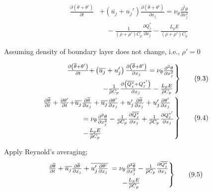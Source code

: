 \documentclass[fleqn,10pt]{SelfArx} %
\begin{document}
\begin{align*}
	\frac{\partial \left(\overline{\theta}+\theta'\right)}{\partial t} &+ \left(\overline{u_j} + u_j'\right)\frac{\partial \left(\overline{\theta} + \theta'\right)}{\partial x_j} = \nu_{\theta}\frac{\partial^2 \theta}{\partial x^2_j} \\ &\quad - \frac{1}{\left(\overline{\rho} + \rho'\right) C_p}\frac{\partial Q_j^*}{\partial x_j} - \frac{L_p E}{\left(\overline{\rho} + \rho'\right) C_p}
\end{align*}

Assuming density of boundary layer does not change, i.e., $\rho' = 0$

\begin{align*}
	\begin{rcases}
		\frac{\partial \left(\overline{\theta}+\theta'\right)}{\partial t} & \!\!\!\!\!\! + \left(\overline{u_j} + u_j'\right)\frac{\partial \left(\overline{\theta} + \theta'\right)}{\partial x_j} = \nu_{\theta}\frac{\partial^2 \theta}{\partial x^2_j} \\ &\quad - \frac{1}{\overline{\rho} C_p}\frac{\partial \left(\overline{Q_j^*} + Q_j^{*'}\right)}{\partial x_j} - \frac{L_p E}{\overline{\rho} C_p}
	\end{rcases} & \tag{9.3} \label{eq:9.3} \\
	\begin{rcases}
		\frac{\partial \overline{\theta}}{\partial t} + \frac{\partial \theta'}{\partial t} & \!\!\!\!\!\! + \overline{u_j} \frac{\partial \overline{\theta}}{\partial x_j} + \overline{u_j} \frac{\partial \theta'}{\partial x_j} + u_j' \frac{\partial \overline{\theta}}{\partial x_j} + u_j' \frac{\partial \theta'}{\partial x_j} \\ &\quad  = \nu_{\theta} \frac{\partial^2 \theta}{\partial x_j^2} - \frac{1}{\overline{\rho} C_p} \frac{\partial \overline{Q_j^*}}{\partial x_j} + \frac{1}{\overline{\rho} C_p} \frac{\partial Q_j^{*'}}{\partial x_j}  \\ &\quad - \frac{L_p E}{\overline{\rho} C_p}
	\end{rcases} & \tag{9.4} \label{eq:9.4}
\end{align*}

Apply Reynold's averaging;
\begin{align*}
	\begin{rcases}
		\frac{\partial \overline{\theta}}{\partial t} + \overline{u_j} \frac{\partial \overline{\theta}}{\partial x_j} + \overline{u_j' \frac{\partial \theta'}{\partial x_j}} & \!\!\! = \nu_{\theta} \frac{\partial^2 \overline{\theta}}{\partial x_j^2} - \frac{1}{\overline{\rho} C_p} \frac{\partial \overline{Q_j^*}}{\partial x_j} \\ &\quad - \frac{L_p E}{\overline{\rho} C_p}
	\end{rcases} & \tag{9.5} \label{eq:9.5}
\end{align*}
\end{document}
